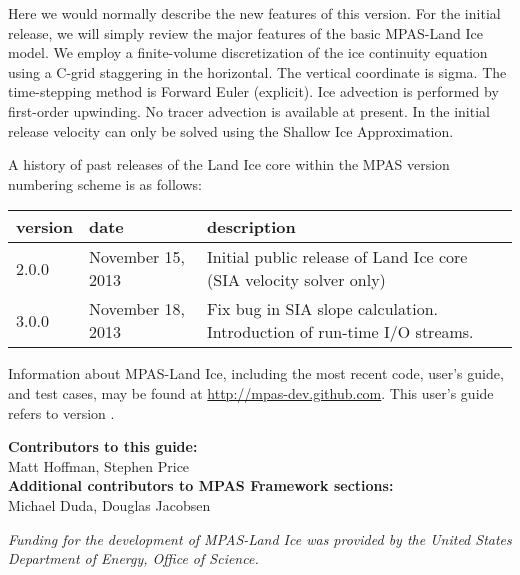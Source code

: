 Here we would normally describe the new features of this version.  For the initial release, we will simply review the major features of the basic MPAS-Land Ice model.  We employ a finite-volume discretization of the ice continuity equation using a C-grid staggering in the horizontal.  The vertical coordinate is sigma.  The time-stepping method is Forward Euler (explicit).  Ice advection is performed by first-order upwinding.  No tracer advection is available at present. In the initial release velocity can only be solved using the Shallow Ice Approximation. 


A history of past releases of the Land Ice core within the MPAS version numbering scheme is as follows:

\begin{tabular}{lll} 
\hline\hline version & date & description  \\
\hline 
2.0.0 & November 15, 2013 & Initial public release of Land Ice core (SIA velocity solver only) \\
\hline 
3.0.0 & November 18, 2013 & Fix bug in SIA slope calculation.  Introduction of run-time I/O streams. \\
\hline 
\end{tabular} 

Information about MPAS-Land Ice, including the most recent code, user's guide, and test cases, may be found at \url{http://mpas-dev.github.com}.  This user's guide refers to version \version.

\vspace{8pt}
\noindent
{\bf Contributors to this guide:}\\
Matt Hoffman, Stephen Price\\
{\bf Additional contributors to MPAS Framework sections:}\\
Michael Duda, Douglas Jacobsen

\vspace{8pt}
\noindent
{\it Funding for the development of MPAS-Land Ice was provided by the United States Department of Energy, Office of Science.}




